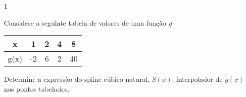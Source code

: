 \documentclass["CN_A-Exercises_Resolutions.tex"]{subfiles}
\begin{document}
\begin{questionBox}1{} %

  Considere a seguinte tabela de valores de uma função \textit{g}
  \begin{center}
    \vspace{1ex}
    \begin{tabular}{C || *{4}{C}}

      x & 1 & 2 & 4 & 8

      \\\hline

      g(x)
      & -2 & 6 & 2 & 40

    \end{tabular}
    \vspace{2ex}
  \end{center}
  Determine a expressão do spline cúbico natural, \(S(x)\), interpolador de \(g(x)\) nos pontos tabelados.


\end{questionBox}
\end{document}
